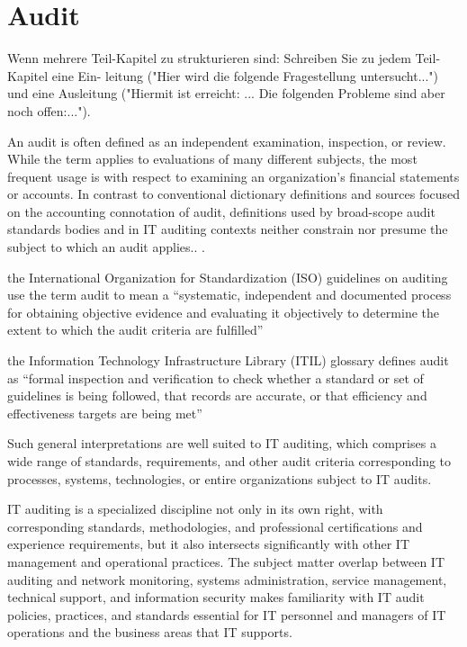 %
\chapter{Audit}\label{chap:audit}

Wenn mehrere Teil-Kapitel zu strukturieren sind: Schreiben Sie zu jedem Teil-Kapitel eine Ein- leitung ("Hier wird die folgende Fragestellung untersucht...") und eine Ausleitung ("Hiermit ist erreicht: ... Die folgenden Probleme sind aber noch offen:...").

An audit is often defined as an independent examination, inspection, or review.
While the term applies to evaluations of many different subjects, the most frequent usage is with respect to examining an organization’s financial statements or accounts. In contrast to conventional dictionary definitions and sources focused on
the accounting connotation of audit, definitions used by broad-scope audit standards bodies and in IT auditing contexts neither constrain nor presume the subject to which an audit applies.. \citep{GANTZ20141}.

the International Organization for
Standardization (ISO) guidelines on auditing use the term audit to mean a “systematic, independent and documented process for obtaining objective evidence and evaluating it objectively to determine the extent to which the audit criteria are fulfilled” \citep{ISOISO1953}

the Information Technology Infrastructure Library (ITIL) glossary
defines audit as “formal inspection and verification to check whether a standard or set of guidelines is being followed, that records are accurate, or that efficiency and
effectiveness targets are being met”~\citep{hanna2011itil}

Such general interpretations are well suited to IT auditing, which comprises a wide range of standards, requirements, and other audit criteria corresponding to processes, systems, technologies, or entire organizations subject to IT audits.

IT auditing is a specialized discipline not only in its own right, with
corresponding standards, methodologies, and professional certifications and experience requirements, but it also intersects significantly with other IT management and
operational practices. The subject matter overlap between IT auditing and network
monitoring, systems administration, service management, technical support, and
information security makes familiarity with IT audit policies, practices, and standards essential for IT personnel and managers of IT operations and the business areas
that IT supports.

